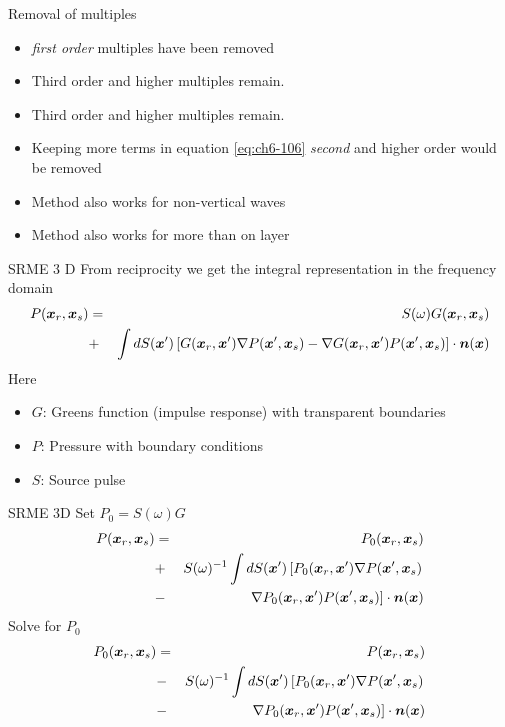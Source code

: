 \documentclass[xcolor=dvipsnames,notes]{beamer}
\begin{document}
%
%
\begin{frame}{Removal of multiples}
\begin{itemize}
   \item {\em first order} multiples have been removed 
   \item Third order and higher multiples remain.
   \item Third order and higher multiples remain.
   \item Keeping more terms in equation \eqref{eq:ch6-106} {\em second} and higher order
         would be removed
   \item Method also works for non-vertical waves
   \item Method also works for more than on layer
\end{itemize}
\end{frame}
%
\begin{frame}{SRME 3 D}
From reciprocity we get the integral representation
in the frequency domain 
\begin{eqnarray*}
P(\mbox{\boldmath $x$}_r,\mbox{\boldmath $x$}_s) & = & S(\omega)G(\mbox{\boldmath $x$}_r,\mbox{\boldmath $x$}_s)                                       \\ 
               & + & \int dS(\mbox{\boldmath $x$}') \left[G(\mbox{\boldmath $x$}_r,\mbox{\boldmath $x$}')\nabla P(\mbox{\boldmath $x$}',\mbox{\boldmath $x$}_s) 
                          -\nabla G(\mbox{\boldmath $x$}_r,\mbox{\boldmath $x$}') P(\mbox{\boldmath $x$}',\mbox{\boldmath $x$}_s)\right]\cdot\mbox{\boldmath $n$}(\mbox{\boldmath $x$})
\end{eqnarray*}
Here
\begin{itemize}
  \item $G$: Greens function (impulse response) with transparent boundaries
  \item $P$: Pressure with boundary conditions
  \item $S$: Source pulse
\end{itemize}
\end{frame}
\begin{frame}{SRME 3D}
Set $P_0 = S(\omega) G$
\begin{eqnarray*}
P(\mbox{\boldmath $x$}_r,\mbox{\boldmath $x$}_s) & = & P_0(\mbox{\boldmath $x$}_r,\mbox{\boldmath $x$}_s)\\
    &  + & S(\omega)^{-1} \int dS(\mbox{\boldmath $x$}') 
         \left[P_0(\mbox{\boldmath $x$}_r,\mbox{\boldmath $x$}')\nabla P(\mbox{\boldmath $x$}',\mbox{\boldmath $x$}_s)\right. \\ 
    &  -  & \left. \nabla P_0(\mbox{\boldmath $x$}_r,\mbox{\boldmath $x$}') P(\mbox{\boldmath $x$}',\mbox{\boldmath $x$}_s)\right]\cdot \mbox{\boldmath $n$}(\mbox{\boldmath $x$})
\end{eqnarray*}
Solve for $P_0$
\begin{eqnarray*}
P_0(\mbox{\boldmath $x$}_r,\mbox{\boldmath $x$}_s) & = & P(\mbox{\boldmath $x$}_r,\mbox{\boldmath $x$}_s)\\
    & - & S(\omega)^{-1} \int dS(\mbox{\boldmath $x$}') 
         \left[P_0(\mbox{\boldmath $x$}_r,\mbox{\boldmath $x$}')\nabla P(\mbox{\boldmath $x$}',\mbox{\boldmath $x$}_s)\right. \\ 
    & - & \left. \nabla P_0(\mbox{\boldmath $x$}_r,\mbox{\boldmath $x$}') P(\mbox{\boldmath $x$}',\mbox{\boldmath $x$}_s)\right]\cdot \mbox{\boldmath $n$}(\mbox{\boldmath $x$})
\end{eqnarray*}
\end{frame}
\end{document}
